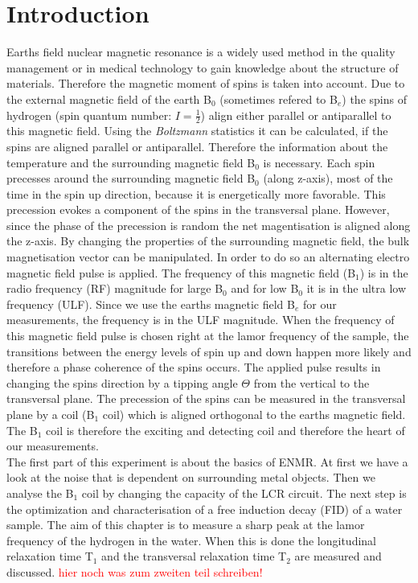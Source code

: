 \section{Introduction}
\label{sec:Introduction}
Earths field nuclear magnetic resonance is a widely used method in the quality management or in medical technology to gain knowledge about the structure of materials. Therefore the magnetic moment of spins is taken into account.\newline
Due to the external magnetic field of the earth B$_0$ (sometimes refered to B$_e$) the spins of hydrogen (spin quantum number: $I=\frac{1}{2}$) align either parallel or antiparallel to this magnetic field. Using the \textit{Boltzmann} statistics it can be calculated, if the spins are aligned parallel or antiparallel. Therefore the information about the temperature and the surrounding magnetic field B$_0$ is necessary. Each spin precesses around the surrounding magnetic field B$_0$ (along z-axis), most of the time in the spin up direction, because it is energetically more favorable. This precession evokes a component of the spins in the transversal plane. However, since the phase of the precession is random the net magentisation is aligned along the z-axis. By changing the properties of the surrounding magnetic field, the bulk magnetisation vector can be manipulated. In order to do so an alternating electro magnetic field pulse is applied. The frequency of this magnetic field (B$_1$) is in the radio frequency (RF) magnitude for large B$_0$ and for low B$_0$ it is in the ultra low frequency (ULF). Since we use the earths magnetic field B$_e$ for our measurements, the frequency is in the ULF magnitude. When the frequency of this magnetic field pulse is chosen right at the lamor frequency of the sample, the transitions between the energy levels of spin up and down happen more likely and therefore a phase coherence of the spins occurs. The applied pulse results in changing the spins direction by a tipping angle $\Theta$ from the vertical to the transversal plane. The precession of the spins can be measured in the transversal plane by a coil (B$_1$ coil) which is aligned orthogonal to the earths magnetic field. The B$_1$ coil is therefore the exciting and detecting coil and therefore the heart of our measurements. \\
The first part of this experiment is about the basics of ENMR. At first we have a look at the noise that is dependent on surrounding metal objects. Then we analyse the B$_1$ coil by changing the capacity of the LCR circuit. The next step is the optimization and characterisation of a free induction decay (FID) of a water sample. The aim of this chapter is to measure a sharp peak at the lamor frequency of the hydrogen in the water. When this is done the longitudinal relaxation time T$_1$ and the transversal relaxation time T$_2$ are measured and discussed.
\textcolor{red}{hier noch was zum zweiten teil schreiben!}
